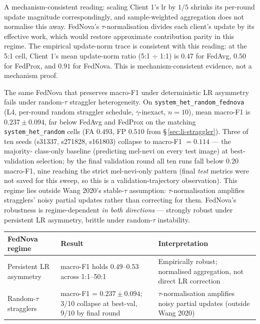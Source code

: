 A mechanism-consistent reading: scaling Client 1's $\textrm{lr}$ by $1/5$
shrinks its per-round update magnitude correspondingly, and sample-weighted
aggregation does not normalise this away. FedNova's $\tau$-normalisation
divides each client's update by its effective work, which would restore
approximate contribution parity in this regime. The empirical update-norm
trace is consistent with this reading: at the 5:1 cell, Client 1's mean
update-norm ratio (5:1 $\div$ 1:1) is $0.47$ for FedAvg, $0.50$ for FedProx,
and $0.91$ for FedNova. This is mechanism-consistent evidence, not a
mechanism proof.

The same FedNova that preserves macro-F1 under deterministic LR asymmetry
fails under random-$\tau$ straggler heterogeneity. On
\texttt{system\_het\_random\_fednova} (L4, per-round random straggler
schedule, $\gamma$-inexact, $n=10$), mean macro-F1 is $0.237 \pm 0.094$, far
below FedAvg and FedProx on the matching \texttt{system\_het\_random} cells
(FA $0.493$, FP $0.510$ from \S\,\ref{sec:li-straggler}). Three of ten seeds
(s31337, s271828, s161803) collapse to macro-F1 $= 0.114$ --- the majority-
class-only baseline (predicting mel-nevi on every test image) at best-validation
selection; by the final validation round all ten runs fall below $0.20$ macro-F1,
nine reaching the strict mel-nevi-only pattern (final \emph{test} metrics were not
saved for this sweep, so this is a validation-trajectory observation). This regime
lies outside Wang 2020's stable-$\tau$ assumption: $\tau$-normalisation
amplifies stragglers' noisy partial updates rather than correcting for them.
FedNova's robustness is regime-dependent \emph{in both directions} ---
strongly robust under persistent LR asymmetry, brittle under random-$\tau$
instability.

\begin{center}
\begin{tabular}{lll}
\hline
FedNova regime              & Result                                   & Interpretation \\
\hline
Persistent LR asymmetry     & macro-F1 holds $0.49$--$0.53$ across 1:1--50:1 & Empirically robust; normalised aggregation, not direct LR correction \\
Random-$\tau$ stragglers    & macro-F1 = $0.237 \pm 0.094$; 3/10 collapse at best-val, 9/10 by final round & $\tau$-normalisation amplifies noisy partial updates (outside Wang 2020) \\
\hline
\end{tabular}
\end{center}

